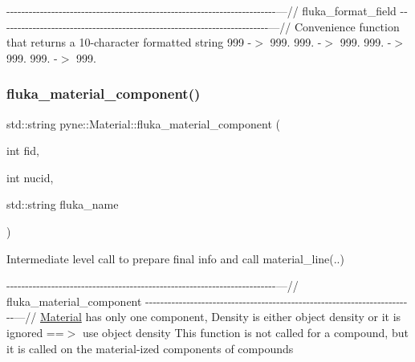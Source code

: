 -\/-\/-\/-\/-\/-\/-\/-\/-\/-\/-\/-\/-\/-\/-\/-\/-\/-\/-\/-\/-\/-\/-\/-\/-\/-\/-\/-\/-\/-\/-\/-\/-\/-\/-\/-\/-\/-\/-\/-\/-\/-\/-\/-\/-\/-\/-\/-\/-\/-\/-\/-\/-\/-\/-\/-\/-\/-\/-\/-\/-\/-\/-\/-\/-\/-\/-\/-\/-\/-\/-\/-\/---// fluka\+\_\+format\+\_\+field -\/-\/-\/-\/-\/-\/-\/-\/-\/-\/-\/-\/-\/-\/-\/-\/-\/-\/-\/-\/-\/-\/-\/-\/-\/-\/-\/-\/-\/-\/-\/-\/-\/-\/-\/-\/-\/-\/-\/-\/-\/-\/-\/-\/-\/-\/-\/-\/-\/-\/-\/-\/-\/-\/-\/-\/-\/-\/-\/-\/-\/-\/-\/-\/-\/-\/-\/-\/-\/-\/-\/-\/---// Convenience function that returns a 10-\/character formatted string 999 -\/$>$ 999. 999. -\/$>$ 999. 999. -\/$>$ 999. 999. -\/$>$ 999. \mbox{\label{classpyne_1_1_material_a3b7bc2f7ca3f2c05860004ea27ebcadb}} 
\subsubsection{\texorpdfstring{fluka\+\_\+material\+\_\+component()}{fluka\_material\_component()}}
{\footnotesize\ttfamily std\+::string pyne\+::\+Material\+::fluka\+\_\+material\+\_\+component (\begin{DoxyParamCaption}\item[{int}]{fid,  }\item[{int}]{nucid,  }\item[{std\+::string}]{fluka\+\_\+name }\end{DoxyParamCaption})}



Intermediate level call to prepare final info and call material\+\_\+line(..) 

-\/-\/-\/-\/-\/-\/-\/-\/-\/-\/-\/-\/-\/-\/-\/-\/-\/-\/-\/-\/-\/-\/-\/-\/-\/-\/-\/-\/-\/-\/-\/-\/-\/-\/-\/-\/-\/-\/-\/-\/-\/-\/-\/-\/-\/-\/-\/-\/-\/-\/-\/-\/-\/-\/-\/-\/-\/-\/-\/-\/-\/-\/-\/-\/-\/-\/-\/-\/-\/-\/-\/-\/---// fluka\+\_\+material\+\_\+component -\/-\/-\/-\/-\/-\/-\/-\/-\/-\/-\/-\/-\/-\/-\/-\/-\/-\/-\/-\/-\/-\/-\/-\/-\/-\/-\/-\/-\/-\/-\/-\/-\/-\/-\/-\/-\/-\/-\/-\/-\/-\/-\/-\/-\/-\/-\/-\/-\/-\/-\/-\/-\/-\/-\/-\/-\/-\/-\/-\/-\/-\/-\/-\/-\/-\/-\/-\/-\/-\/-\/-\/---// \hyperlink{classpyne_1_1_material}{Material} has only one component, Density is either object density or it is ignored ==$>$ use object density This function is not called for a compound, but it is called on the material-\/ized components of compounds \mbox{\label{classpyne_1_1_material_a269b13dac00eb3ba0ff31feb5bd3b0ca}} 
